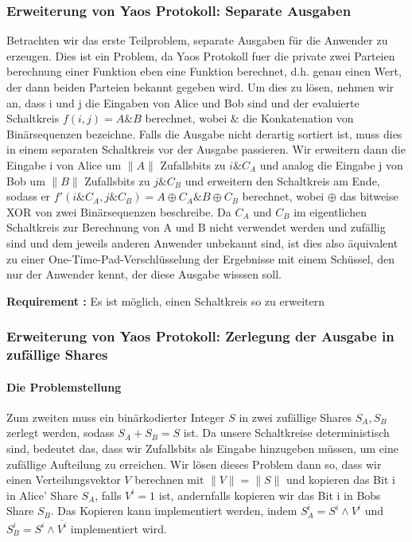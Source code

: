 \documentclass{article}
\newcounter{requirementscount}{}
\newcommand{\requirement}[1] {
        \addtocounter{requirementscount}{1}
        {\bf Requirement \therequirementscount:} #1\\
    }
\begin{document}
\subsubsection{Erweiterung von Yaos Protokoll:  Separate Ausgaben}
Betrachten wir das erste Teilproblem, separate Ausgaben f\"ur die Anwender
zu erzeugen. Dies ist ein Problem, da Yaos Protokoll fuer die private 
zwei Parteien berechnung einer Funktion eben eine Funktion berechnet, d.h.
genau einen Wert, der dann beiden Parteien bekannt gegeben wird. 
Um dies zu l\"osen, nehmen wir an, dass i und j die Eingaben von Alice
und Bob sind und der evaluierte Schaltkreis \(f(i, j) = A \& B\) berechnet,
wobei \(\&\) die Konkatenation von Bin\"arsequenzen bezeichne.
Falls die Ausgabe nicht derartig sortiert ist, muss dies in einem separaten
Schaltkreis vor der Ausgabe passieren. Wir erweitern dann die Eingabe i
von Alice um \(\|A\|\) Zufallsbits zu \(i \& C_A\) und analog die Eingabe
j von Bob um \(\|B\|\) Zufallsbits zu \(j \& C_B\) und erweitern den 
Schaltkreis am Ende, sodass er 
\(f'(i\&C_A, j\&C_B) = A \oplus C_A \& B \oplus C_B\) berechnet, wobei
\(\oplus\) das bitweise XOR von zwei Bin\"arsequenzen beschreibe. Da \(C_A\)
und \(C_B\) im eigentlichen Schaltkreis zur Berechnung von A und B nicht
verwendet werden und zuf\"allig sind und dem jeweils anderen Anwender 
unbekannt sind, ist dies also \"aquivalent zu einer 
One-Time-Pad-Verschl\"usselung der Ergebnisse mit einem Sch\"ussel, den
nur der Anwender kennt, der diese Ausgabe wisssen soll.\\
\requirement{Es ist m\"oglich, einen Schaltkreis so zu erweitern}

\subsubsection{Erweiterung von Yaos Protokoll: Zerlegung der Ausgabe in zuf\"allige Shares}
\paragraph{Die Problemstellung}
Zum zweiten muss ein bin\"arkodierter Integer \(S\) in zwei zuf\"allige Shares 
\(S_A, S_B\) zerlegt werden, sodass \(S_A + S_B = S\) ist. Da unsere
Schaltkreise deterministisch sind, bedeutet das, dass wir Zufallsbits als 
Eingabe hinzugeben m\"ussen, um eine zuf\"allige Aufteilung zu erreichen.
Wir l\"osen dieses Problem dann so, dass wir einen Verteilungsvektor \(V\)
berechnen mit \(\|V\| = \|S\|\) und kopieren das Bit i in Alice' Share \(S_A\),
falls \(V^i = 1\) ist, andernfalls kopieren wir das Bit i in Bobs Share \(S_B\).
Das Kopieren kann implementiert werden, indem \(S_A^i = S^i \wedge V^i\) und
\(S_B^i = S^i \wedge \overline{V^i}\) implementiert wird.
\end{document}
